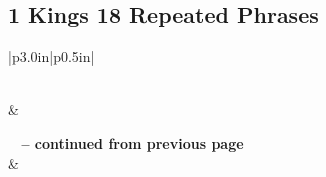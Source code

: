 \subsection{1 Kings 18 Repeated Phrases}


\normalsize
 
\begin{center}
\begin{longtable}{|p{3.0in}|p{0.5in}|}
\caption[1 Kings 18 Repeated Phrases]{1 Kings 18 Repeated Phrases}\label{table:Repeated Phrases 1 Kings 18} \\
\hline {} &  \\ \hline 
\endfirsthead
 
{{\bfseries \tablename\ \thetable{} -- continued from previous page}} \\  
\hline {} &  \\ \hline 
\endhead
 

\end{longtable}
\end{center}
